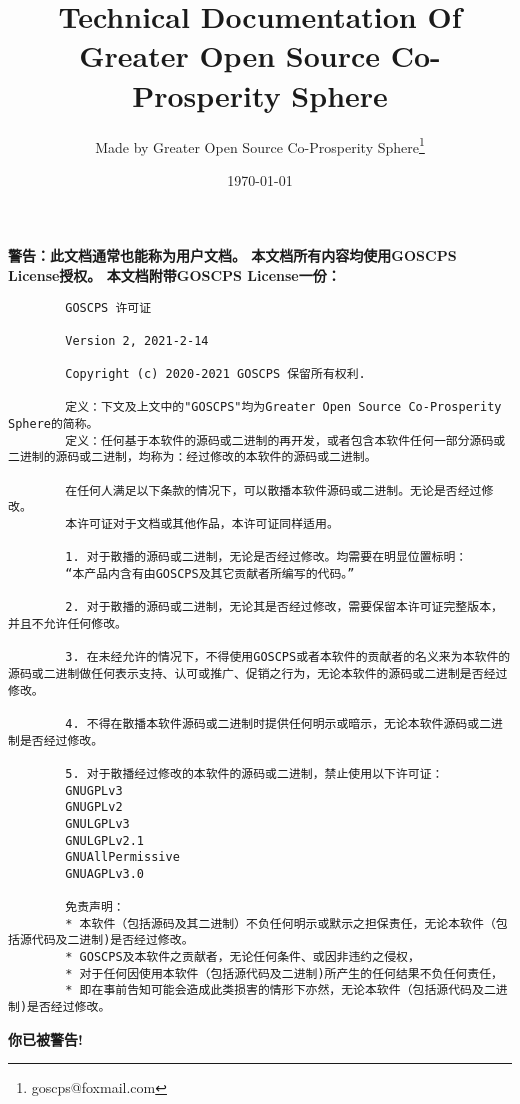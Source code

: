 \documentclass[UTF-8,twoside,a4paper,final,titlepage]{ctexbook}
\begin{document}
	\frontmatter
	
	\title{Technical Documentation Of Greater Open Source Co-Prosperity Sphere} 
	\author{Made by Greater Open Source Co-Prosperity Sphere\thanks{goscps@foxmail.com}}
	\date{\today}
	\maketitle
	
	\textbf{警告：此文档通常也能称为用户文档。
		本文档所有内容均使用GOSCPS License授权。\newline{}
		本文档附带GOSCPS License一份：}
	\begin{lstlisting}
		GOSCPS 许可证
		
		Version 2, 2021-2-14
		
		Copyright (c) 2020-2021 GOSCPS 保留所有权利.
		
		定义：下文及上文中的"GOSCPS"均为Greater Open Source Co-Prosperity Sphere的简称。
		定义：任何基于本软件的源码或二进制的再开发，或者包含本软件任何一部分源码或二进制的源码或二进制，均称为：经过修改的本软件的源码或二进制。
		
		在任何人满足以下条款的情况下，可以散播本软件源码或二进制。无论是否经过修改。
		本许可证对于文档或其他作品，本许可证同样适用。
		
		1. 对于散播的源码或二进制，无论是否经过修改。均需要在明显位置标明：
		“本产品内含有由GOSCPS及其它贡献者所编写的代码。”
		
		2. 对于散播的源码或二进制，无论其是否经过修改，需要保留本许可证完整版本，并且不允许任何修改。
		
		3. 在未经允许的情况下，不得使用GOSCPS或者本软件的贡献者的名义来为本软件的源码或二进制做任何表示支持、认可或推广、促销之行为，无论本软件的源码或二进制是否经过修改。
		
		4. 不得在散播本软件源码或二进制时提供任何明示或暗示，无论本软件源码或二进制是否经过修改。
		
		5. 对于散播经过修改的本软件的源码或二进制，禁止使用以下许可证：
		GNUGPLv3
		GNUGPLv2
		GNULGPLv3
		GNULGPLv2.1
		GNUAllPermissive
		GNUAGPLv3.0
		
		免责声明：
		* 本软件（包括源码及其二进制）不负任何明示或默示之担保责任，无论本软件（包括源代码及二进制)是否经过修改。
		* GOSCPS及本软件之贡献者，无论任何条件、或因非违约之侵权，
		* 对于任何因使用本软件（包括源代码及二进制)所产生的任何结果不负任何责任，
		* 即在事前告知可能会造成此类损害的情形下亦然，无论本软件（包括源代码及二进制)是否经过修改。
	\end{lstlisting}
	\textbf{你已被警告!}
	
	\tableofcontents
	
	\mainmatter
	
	
	
	\backmatter
	
	
	
	\printindex
	
\end{document}
